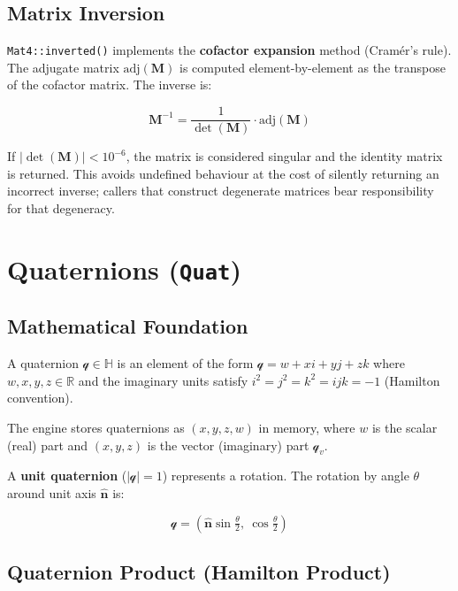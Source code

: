 \subsection{Matrix Inversion}

\texttt{Mat4::inverted()} implements the \textbf{cofactor expansion} method
(Cram\'er's rule). The adjugate matrix $\text{adj}(\mathbf{M})$ is computed
element-by-element as the transpose of the cofactor matrix. The inverse is:

\[
\mathbf{M}^{-1} = \frac{1}{\det(\mathbf{M})} \cdot \text{adj}(\mathbf{M})
\]

If $|\det(\mathbf{M})| < 10^{-6}$, the matrix is considered singular and
the identity matrix is returned. This avoids undefined behaviour at the
cost of silently returning an incorrect inverse; callers that construct
degenerate matrices bear responsibility for that degeneracy.

\section{Quaternions (\texttt{Quat})}

\subsection{Mathematical Foundation}

\begin{definition}[Quaternion]
A quaternion $\mathcal{q} \in \mathbb{H}$ is an element of the form
$\mathcal{q} = w + xi + yj + zk$ where $w, x, y, z \in \mathbb{R}$ and
the imaginary units satisfy $i^2 = j^2 = k^2 = ijk = -1$ (Hamilton convention).
\end{definition}

The engine stores quaternions as $(x, y, z, w)$ in memory, where $w$ is
the scalar (real) part and $(x, y, z)$ is the vector (imaginary) part
$\mathcal{q}_v$.

A \textbf{unit quaternion} ($|\mathcal{q}| = 1$) represents a rotation.
The rotation by angle $\theta$ around unit axis $\hat{\mathbf{n}}$ is:

\begin{equation}
\mathcal{q} = \left(\hat{\mathbf{n}} \sin\tfrac{\theta}{2},\ \cos\tfrac{\theta}{2}\right)
\label{eq:quat-axis-angle}
\end{equation}

\subsection{Quaternion Product (Hamilton Product)}

